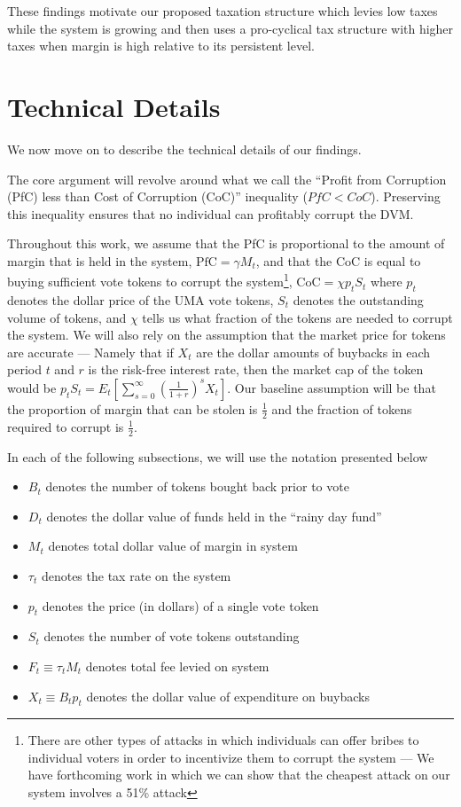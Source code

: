 \documentclass[12pt]{article}
\begin{document}
  These findings motivate our proposed taxation structure which levies low taxes while the system
  is growing and then uses a pro-cyclical tax structure with higher taxes when margin is high
  relative to its persistent level.

  \clearpage
  \newpage

\section{Technical Details}

  We now move on to describe the technical details of our findings.

  The core argument will revolve around what we call the ``Profit from Corruption (PfC) less than
  Cost of Corruption (CoC)'' inequality ($PfC < CoC$). Preserving this inequality ensures that no
  individual can profitably corrupt the DVM.

  Throughout this work, we assume that the PfC is proportional to the amount of margin that is held
  in the system, $\text{PfC} = \gamma M_t$, and that the CoC is equal to buying sufficient vote
  tokens to corrupt the system\footnote{There are other types of attacks in which individuals can
  offer bribes to individual voters in order to incentivize them to corrupt the system --- We have
  forthcoming work in which we can show that the cheapest attack on our system involves a 51\%
  attack}, $\text{CoC} = \chi p_t S_t$ where $p_t$ denotes the dollar price of the UMA vote tokens,
  $S_t$ denotes the outstanding volume of tokens, and $\chi$ tells us what fraction of the tokens
  are needed to corrupt the system. We will also rely on the assumption that the market price for
  tokens are accurate --- Namely that if $X_t$ are the dollar amounts of buybacks in each period
  $t$ and $r$ is the risk-free interest rate, then the market cap of the token would be
  $p_t S_t = E_t \left[ \sum_{s=0}^{\infty} \left(\frac{1}{1 + r}\right)^s X_t \right]$.
  Our baseline assumption will be that the proportion of margin that can be stolen is $\frac{1}{2}$
  and the fraction of tokens required to corrupt is $\frac{1}{2}$.

  In each of the following subsections, we will use the notation presented below

  \begin{itemize}
    \item $B_t$ denotes the number of tokens bought back prior to vote
    \item $D_t$ denotes the dollar value of funds held in the ``rainy day fund''
    \item $M_t$ denotes total dollar value of margin in system
    \item $\tau_t$ denotes the tax rate on the system
    \item $p_t$ denotes the price (in dollars) of a single vote token
    \item $S_t$ denotes the number of vote tokens outstanding
    \item $F_t \equiv \tau_t M_t$ denotes total fee levied on system
    \item $X_t \equiv B_t p_t$ denotes the dollar value of expenditure on buybacks
  \end{itemize}
\end{document}
